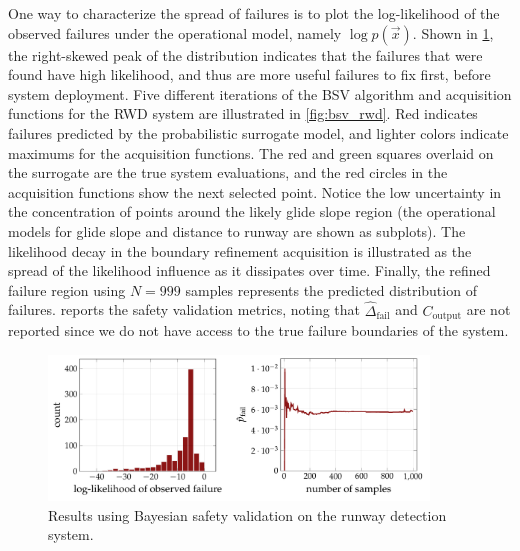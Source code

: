 One way to characterize the spread of failures is to plot the log-likelihood of the observed failures under the operational model, namely $\log p(\vec{x})$.
Shown in \cref{fig:rwd_ll_and_pfail}, the right-skewed peak of the distribution indicates that the failures that were found have high likelihood, and thus are more useful failures to fix first, before system deployment.
Five different iterations of the BSV algorithm and acquisition functions for the RWD system are illustrated in \cref{fig:bsv_rwd}.
Red indicates failures predicted by the probabilistic surrogate model, and lighter colors indicate maximums for the acquisition functions.
The red and green squares overlaid on the surrogate are the true system evaluations, and the red circles in the acquisition functions show the next selected point.
Notice the low uncertainty in the concentration of points around the likely glide slope region (the operational models for glide slope and distance to runway are shown as subplots).
The likelihood decay in the boundary refinement acquisition is illustrated as the spread of the likelihood influence as it dissipates over time.
Finally, the refined failure region using $N=\num{999}$ samples represents the predicted distribution of failures.
 reports the safety validation metrics, noting that $\hat{\Delta}_\text{fail}$ and $C_\text{output}$ are not reported since we do not have access to the true failure boundaries of the system.


\begin{figure}[t!]
    \centering
    \includegraphics[width=0.9\textwidth]{figures/bsv/rwd/rwd_loglikelihood_pfail.pdf}
    \caption{Results using Bayesian safety validation on the runway detection system.}
    \label{fig:rwd_ll_and_pfail}
\end{figure}


